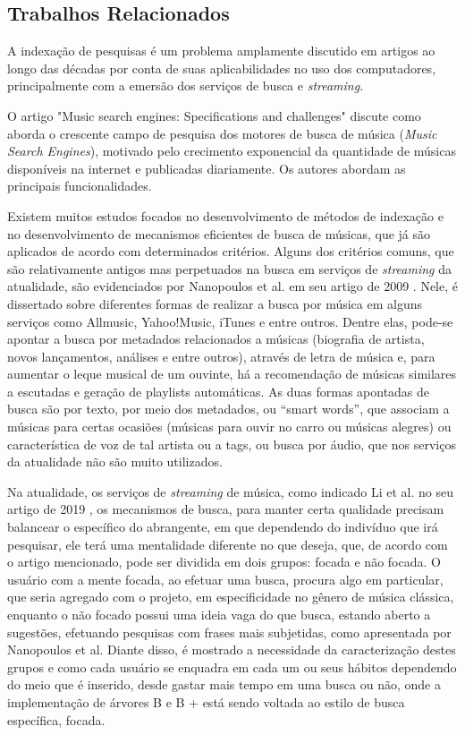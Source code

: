 \documentclass[12pt]{article}
\begin{document}
\subsection{Trabalhos Relacionados}

A indexação de pesquisas é um problema amplamente discutido em artigos ao longo
das décadas por conta de suas aplicabilidades no uso dos computadores,
principalmente com a emersão dos serviços de busca e \emph{streaming}.

O artigo "Music search engines: Specifications and challenges" discute como
aborda o crescente campo de pesquisa dos motores de busca de música (\emph{Music
Search Engines}), motivado pelo crecimento exponencial da quantidade de músicas
disponíveis na internet e publicadas diariamente. Os autores abordam as
principais funcionalidades.


{\color{red}Existem muitos estudos focados no desenvolvimento de métodos de indexação
e no desenvolvimento de mecanismos eficientes de busca de músicas, que já são
aplicados de acordo com determinados critérios.} Alguns dos critérios comuns,
que são relativamente antigos mas perpetuados na busca em serviços de \emph{streaming}
da atualidade, são evidenciados por  Nanopoulos et al. em seu artigo de 2009 \cite{NaRaRuMa:09}. Nele, é
dissertado sobre diferentes formas de realizar a busca por música em alguns
serviços como Allmusic, Yahoo!Music, iTunes e entre outros. Dentre elas,
pode-se apontar a busca por metadados relacionados a músicas (biografia de
artista, novos lançamentos, análises e entre outros), através de letra de música
e, para aumentar o leque musical de um ouvinte, há a recomendação de músicas
similares a escutadas e geração de playlists automáticas. As duas formas
apontadas de busca são por texto, por meio dos metadados, ou “smart words”, que
associam a músicas para certas ocasiões (músicas para ouvir no carro ou músicas
alegres) ou característica de voz de tal artista ou a tags, ou busca por áudio,
que nos serviços da atualidade não são muito utilizados.

Na atualidade, os serviços de \emph{streaming} de música, como indicado Li et al. no seu
artigo de 2019 \cite{LiThChToGa:19}, os mecanismos de busca, para manter certa qualidade precisam
balancear o específico do abrangente, em que dependendo do indivíduo que irá
pesquisar, ele terá uma mentalidade diferente no que deseja, que, de acordo com o artigo
mencionado, pode ser dividida em dois grupos: focada e não focada. O usuário com
a mente focada, ao efetuar uma busca, procura algo em particular, que seria agregado com o projeto, em
especificidade no gênero de música clássica, enquanto o não focado possui uma
ideia vaga do que busca, estando aberto a sugestões, efetuando pesquisas com frases mais subjetidas,
como apresentada por Nanopoulos et al. Diante disso, é mostrado a
necessidade da caracterização destes grupos e como cada usuário se enquadra em
cada um ou seus hábitos dependendo do meio que é inserido, desde gastar mais
tempo em uma busca ou não, onde a implementação de árvores B e B + está sendo
voltada ao estilo de busca específica, focada.
\end{document}
